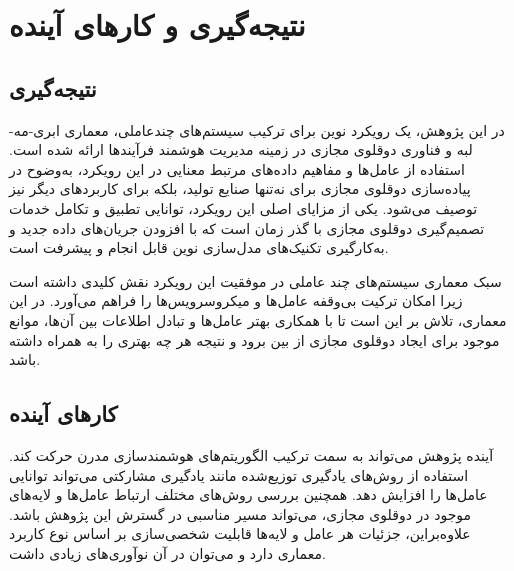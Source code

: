 \chapter{نتیجه‌گیری و کار‌های آینده}

\section{نتیجه‌گیری}
در این پژوهش، یک رویکرد نوین برای ترکیب سیستم‌های چندعاملی، معماری ابری-مه-لبه و فناوری دوقلوی مجازی در زمینه مدیریت هوشمند فرآیندها ارائه شده است.
استفاده از عامل‌ها و مفاهیم داده‌های مرتبط معنایی در این رویکرد، به‌وضوح در پیاده‌سازی دوقلوی مجازی برای نه‌تنها صنایع تولید، بلکه برای کاربرد‌های دیگر نیز توصیف می‌شود. یکی از مزایای اصلی این رویکرد، توانایی تطبیق و تکامل خدمات تصمیم‌گیری دوقلوی مجازی با گذر زمان است که با افزودن جریان‌های داده جدید و به‌کارگیری تکنیک‌های مدل‌سازی نوین قابل انجام و پیشرفت است.

سبک معماری سیستم‌های چند عاملی در موفقیت این رویکرد نقش کلیدی داشته است زیرا امکان ترکیت بی‌وقفه عامل‌ها و میکروسرویس‌ها را فراهم می‌آورد. در این معماری، تلاش بر این است تا با همکاری بهتر عامل‌ها و تبادل اطلاعات بین آن‌ها، موانع موجود برای ایجاد دوقلوی مجازی از بین برود و نتیجه هر چه بهتری را به همراه داشته باشد.

\section{کار‌های آینده}
آینده پژوهش می‌تواند به سمت ترکیب الگوریتم‌های هوشمند‌سازی مدرن حرکت کند. استفاده از روش‌های یادگیری توزیع‌شده مانند یادگیری مشارکتی
می‌تواند توانایی عامل‌ها را افزایش دهد. همچنین بررسی روش‌های مختلف ارتباط عامل‌ها و لایه‌های موجود در دوقلوی مجازی، می‌تواند مسیر مناسبی در گسترش این پژوهش باشد. علاوه‌براین، جزئیات هر عامل و لایه‌ها قابلیت شخصی‌سازی بر اساس نوع کاربرد معماری دارد و می‌توان در آن نو‌آوری‌های زیادی داشت.